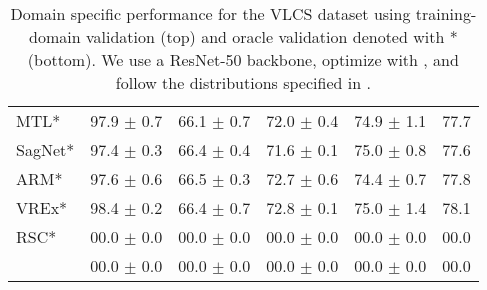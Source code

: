 \begin{table*}
\begin{center}
\begin{tabular}{lccccc}
MTL*                  & 97.9 $\pm$ 0.7       & 66.1 $\pm$ 0.7       & 72.0 $\pm$ 0.4       & 74.9 $\pm$ 1.1       & 77.7                 \\
SagNet*               & 97.4 $\pm$ 0.3       & 66.4 $\pm$ 0.4       & 71.6 $\pm$ 0.1       & 75.0 $\pm$ 0.8       & 77.6                 \\
ARM*                  & 97.6 $\pm$ 0.6       & 66.5 $\pm$ 0.3       & 72.7 $\pm$ 0.6       & 74.4 $\pm$ 0.7       & 77.8                 \\
VREx*                 & 98.4 $\pm$ 0.2       & 66.4 $\pm$ 0.7       & 72.8 $\pm$ 0.1       & 75.0 $\pm$ 1.4       & 78.1                 \\
RSC*                  & 00.0 $\pm$ 0.0       & 00.0 $\pm$ 0.0        & 00.0 $\pm$ 0.0       & 00.0 $\pm$ 0.0        & 00.0                 \\
\tdivcams 	   & 00.0 $\pm$ 0.0       & 00.0 $\pm$ 0.0        & 00.0 $\pm$ 0.0       & 00.0 $\pm$ 0.0        & 00.0                 \\
\bottomrule
\end{tabular}
\caption[Domain specific performance for the VLCS dataset]{Domain specific performance for the VLCS dataset using training-domain validation (top) and  oracle validation denoted with * (bottom). We use a ResNet-50 backbone, optimize with \adam, and follow the distributions specified in \domainbed.}
\end{center}
\end{table*}



